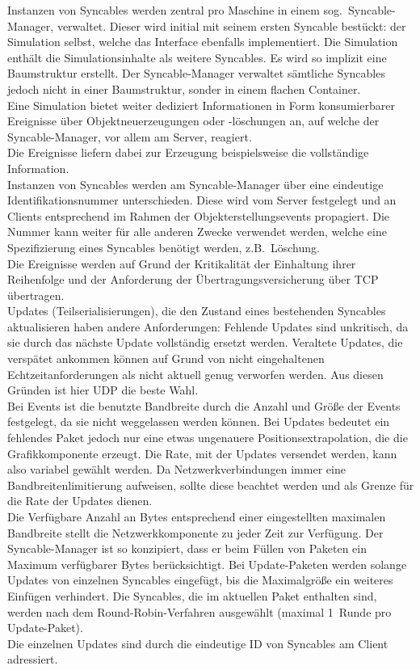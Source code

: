 Instanzen von Syncables werden zentral pro Maschine in einem sog.~Syncable-Manager, verwaltet. 
Dieser wird initial mit seinem ersten Syncable bestückt: der Simulation selbst, welche das Interface ebenfalls implementiert. Die Simulation enthält die Simulationsinhalte als weitere Syncables. Es wird so implizit eine Baumstruktur erstellt. Der Syncable-Manager verwaltet sämtliche Syncables jedoch nicht in einer Baumstruktur, sonder in einem flachen Container.\\
Eine Simulation bietet weiter dediziert Informationen in Form konsumierbarer Ereignisse über Objektneuerzeugungen oder -löschungen an, auf welche der Syncable-Manager, vor allem am Server, reagiert.\\
Die Ereignisse liefern dabei zur Erzeugung beispielsweise die vollständige Information.\\
Instanzen von Syncables werden am Syncable-Manager über eine eindeutige Identifikationsnummer unterschieden. Diese wird vom Server festgelegt und an Clients entsprechend im Rahmen der Objekterstellungsevents propagiert. Die Nummer kann weiter für alle anderen Zwecke verwendet werden, welche eine Spezifizierung eines Syncables benötigt werden, z.B.~Löschung.\\
Die Ereignisse werden auf Grund der Kritikalität der Einhaltung ihrer Reihenfolge und der Anforderung der Übertragungsversicherung über TCP übertragen.\\
Updates (Teilserialisierungen), die den Zustand eines bestehenden Syncables aktualisieren haben andere Anforderungen: Fehlende Updates sind unkritisch, da sie durch das nächste Update vollständig ersetzt werden. Veraltete Updates, die verspätet ankommen können auf Grund von nicht eingehaltenen Echtzeitanforderungen als nicht aktuell genug verworfen werden. Aus diesen Gründen ist hier UDP die beste Wahl.\\
Bei Events ist die benutzte Bandbreite durch die Anzahl und Größe der Events festgelegt, da sie nicht weggelassen werden können. Bei Updates bedeutet ein fehlendes Paket jedoch nur eine etwas ungenauere Positionsextrapolation, die die Grafikkomponente erzeugt. Die Rate, mit der Updates versendet werden, kann also variabel gewählt werden. Da Netzwerkverbindungen immer eine Bandbreitenlimitierung aufweisen, sollte diese beachtet werden und als Grenze für die Rate der Updates dienen.\\
Die Verfügbare Anzahl an Bytes entsprechend einer eingestellten maximalen Bandbreite stellt die Netzwerkkomponente zu jeder Zeit zur Verfügung.
Der Syncable-Manager ist so konzipiert, dass er beim Füllen von Paketen ein Maximum verfügbarer Bytes berücksichtigt.
Bei Update-Paketen werden solange Updates von einzelnen Syncables eingefügt, bis die Maximalgröße ein weiteres Einfügen verhindert. Die Syncables, die im aktuellen Paket enthalten sind, werden nach dem Round-Robin-Verfahren ausgewählt (maximal 1~Runde pro Update-Paket).\\
Die einzelnen Updates sind durch die eindeutige ID von Syncables am Client adressiert.


